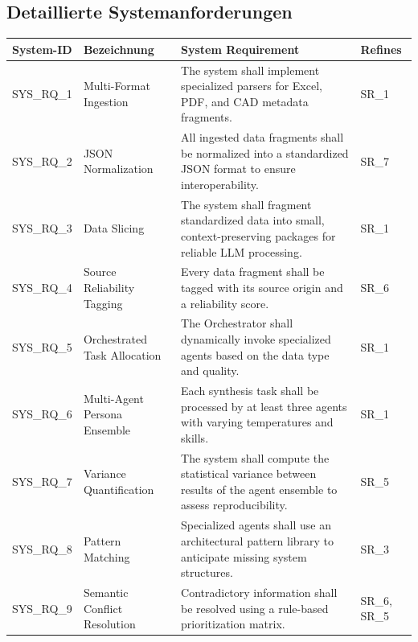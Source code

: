 \documentclass{article}
\begin{document}
\subsection*{Detaillierte Systemanforderungen}

\begin{table}[ht]
\small
\centering
\begin{tabularx}{\textwidth}{@{} l X X l @{}}
\toprule
\textbf{System-ID} & \textbf{Bezeichnung} & \textbf{System Requirement} & \textbf{Refines} \\
\midrule

SYS\_RQ\_1 & Multi-Format Ingestion &
The system shall implement specialized parsers for Excel, PDF, and CAD metadata fragments. &
SR\_1 \\

SYS\_RQ\_2 & JSON Normalization &
All ingested data fragments shall be normalized into a standardized JSON format to ensure interoperability. &
SR\_7 \\

SYS\_RQ\_3 & Data Slicing &
The system shall fragment standardized data into small, context-preserving packages for reliable LLM processing. &
SR\_1 \\

SYS\_RQ\_4 & Source Reliability Tagging &
Every data fragment shall be tagged with its source origin and a reliability score. &
SR\_6 \\

SYS\_RQ\_5 & Orchestrated Task Allocation &
The Orchestrator shall dynamically invoke specialized agents based on the data type and quality. &
SR\_1 \\

SYS\_RQ\_6 & Multi-Agent Persona Ensemble &
Each synthesis task shall be processed by at least three agents with varying temperatures and skills. &
SR\_1 \\

SYS\_RQ\_7 & Variance Quantification &
The system shall compute the statistical variance between results of the agent ensemble to assess reproducibility. &
SR\_5 \\

SYS\_RQ\_8 & Pattern Matching &
Specialized agents shall use an architectural pattern library to anticipate missing system structures. &
SR\_3 \\

SYS\_RQ\_9 & Semantic Conflict Resolution &
Contradictory information shall be resolved using a rule-based prioritization matrix. &
SR\_6, SR\_5 \\


\end{tabularx}
\end{table}
\end{document}
